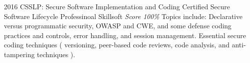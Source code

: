 \documentclass[11pt,a4paper]{moderncv}
\begin{document}
\cventry                                                                                                          %
    {2016}                                                                                                        %
    {CSSLP: Secure Software Implementation and Coding}                                                            %
    {Certified Secure Software Lifecycle Professinoal}                                                            %
    {Skillsoft}                                                                                                   %
    {\textit{Score 100\%}}                                                                                        %
    {                                                                                                             %
        Topics include:                                                                                           %
            Declarative versus programmatic security,                                                             %
            OWASP and CWE,                                                                                        %
            and some defense coding practices and controls,                                                       %
            error handling,                                                                                       %
            and session management.                                                                               %
            Essential secure coding techniques (                                                                  %
                versioning,                                                                                       %
                peer-based code reviews,                                                                          %
                code analysis,                                                                                    %
                and anti-tampering techniques                                                                     %
            ).                                                                                                    %
    }                                                                                                             %
\end{document}
